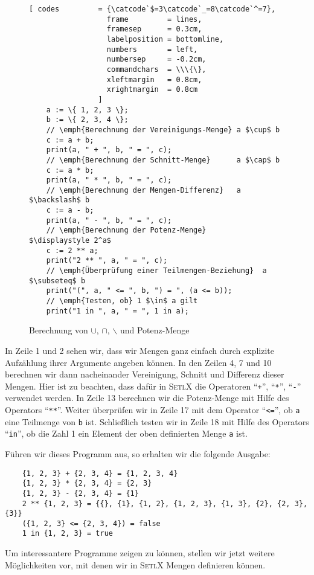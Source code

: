 \begin{figure}[!ht]
  \centering
\begin{Verbatim}[ codes         = {\catcode`$=3\catcode`_=8\catcode`^=7},
                  frame         = lines, 
                  framesep      = 0.3cm, 
                  labelposition = bottomline,
                  numbers       = left,
                  numbersep     = -0.2cm,
                  commandchars  = \\\{\},
                  xleftmargin   = 0.8cm,
                  xrightmargin  = 0.8cm
                ]
    a := \{ 1, 2, 3 \};
    b := \{ 2, 3, 4 \};
    // \emph{Berechnung der Vereinigungs-Menge} a $\cup$ b 
    c := a + b;
    print(a, " + ", b, " = ", c);
    // \emph{Berechnung der Schnitt-Menge}      a $\cap$ b
    c := a * b;
    print(a, " * ", b, " = ", c);
    // \emph{Berechnung der Mengen-Differenz}   a $\backslash$ b
    c := a - b;
    print(a, " - ", b, " = ", c);
    // \emph{Berechnung der Potenz-Menge}      $\displaystyle 2^a$
    c := 2 ** a;
    print("2 ** ", a, " = ", c);
    // \emph{Überprüfung einer Teilmengen-Beziehung}  a $\subseteq$ b
    print("(", a, " <= ", b, ") = ", (a <= b)); 
    // \emph{Testen, ob} 1 $\in$ a gilt
    print("1 in ", a, " = ", 1 in a);
\end{Verbatim} 
\vspace*{-0.3cm}
\caption{Berechnung von $\cup$, $\cap$, $\backslash$ und Potenz-Menge}
  \label{fig:simple.stlx}
\end{figure} %

\noindent
In Zeile 1 und 2 sehen wir, dass wir Mengen ganz einfach durch explizite Aufzählung ihrer
Argumente angeben können.  In den Zeilen 4, 7 und 10 berechnen wir dann nacheinander 
Vereinigung, Schnitt und Differenz dieser Mengen.  Hier ist zu beachten, dass dafür
in \textsc{SetlX} die Operatoren ``\texttt{+}'', ``\texttt{*}'', ``\texttt{-}''
verwendet werden.  
In Zeile 13 berechnen wir die Potenz-Menge mit Hilfe des Operators ``\texttt{**}''.
Weiter überprüfen wir in Zeile 17 mit dem Operator ``\texttt{<=}'', 
ob \texttt{a} eine Teilmenge von \texttt{b} ist.  Schließlich testen wir in Zeile 18 mit Hilfe des
Operators ``\texttt{in}'', ob die Zahl 1 ein Element der oben definierten Menge \texttt{a} ist.

Führen wir dieses Programm aus, so
erhalten wir die folgende Ausgabe:
\begin{verbatim}
    {1, 2, 3} + {2, 3, 4} = {1, 2, 3, 4}
    {1, 2, 3} * {2, 3, 4} = {2, 3}
    {1, 2, 3} - {2, 3, 4} = {1}
    2 ** {1, 2, 3} = {{}, {1}, {1, 2}, {1, 2, 3}, {1, 3}, {2}, {2, 3}, {3}}
    ({1, 2, 3} <= {2, 3, 4}) = false
    1 in {1, 2, 3} = true
\end{verbatim}
Um interessantere Programme zeigen zu können, stellen wir jetzt weitere
Möglichkeiten vor, mit denen wir in \textsc{SetlX} Mengen definieren können.

